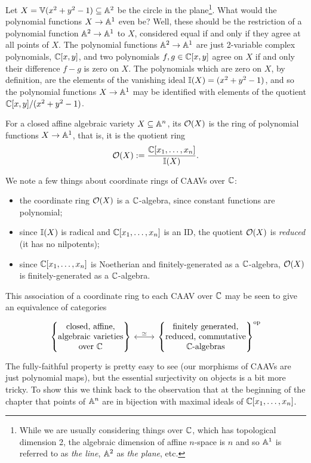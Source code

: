 \begin{eg}
	Let $X = \mathbb{V}(x^2 + y^2 - 1) \subseteq \mathbb{A}^2$ be the circle in the plane\footnote{While we are usually considering things over $\mathbb{C}$, which has topological dimension 2, the algebraic dimension of affine $n$-space is $n$ and so $\mathbb{A}^1$ is referred to as \emph{the line}, $\mathbb{A}^2$ as \emph{the plane}, etc.}. What would the polynomial functions $X \to \mathbb{A}^1$ even be? Well, these should be the restriction of a polynomial function $\mathbb{A}^2 \to \mathbb{A}^1$ to $X$, considered equal if and only if they agree at all points of $X$. The polynomial functions $\mathbb{A}^2 \to \mathbb{A}^1$ are just 2-variable complex polynomials, $\mathbb{C}[x,y]$, and two polynomials $f, g \in \mathbb{C}[x,y]$ agree on $X$ if and only their difference $f-g$ is zero on $X$. The polynomials which are zero on $X$, by definition, are the elements of the vanishing ideal $\mathbb{I}(X) = (x^2 + y^2 - 1)$, and so the polynomial functions $X \to \mathbb{A}^1$ may be identified with elements of the quotient $\mathbb{C}[x, y]/(x^2 + y^2 - 1)$.
\end{eg}

\begin{defn}
	For a closed affine algebraic variety $X \subseteq \mathbb{A}^n$, its  $\mathcal{O}(X)$ is the ring of polynomial functions $X \to \mathbb{A}^1$, that is, it is the quotient ring 
	\[
		\mathcal{O}(X) := \frac{\mathbb{C}[x_1,\ldots,x_n]}{\mathbb{I}(X)}.
	\]
\end{defn}

We note a few things about coordinate rings of CAAVs over $\mathbb{C}$:
\begin{itemize}
	\item the coordinate ring $\mathcal{O}(X)$ is a $\mathbb{C}$-algebra, since constant functions are polynomial;
	\item since $\mathbb{I}(X)$ is radical and $\mathbb{C}[x_1, \ldots, x_n]$ is an ID, the quotient $\mathcal{O}(X)$ is \emph{reduced} (it has no nilpotents);
	\item since $\mathbb{C}[x_1, \ldots, x_n]$ is Noetherian and finitely-generated as a $\mathbb{C}$-algebra, $\mathcal{O}(X)$ is finitely-generated as a $\mathbb{C}$-algebra.
\end{itemize}

This association of a coordinate ring to each CAAV over $\mathbb{C}$ may be seen to give an equivalence of categories
\[
	\begin{tikzcd}
		\left\{\bettersubstack{\text{closed, affine,} \\ \text{algebraic varieties} \\ \text{over }\C}\right\} \rar[leftrightarrow, "\simeq"] & \left\{\bettersubstack{\text{finitely generated,}\\ \text{reduced, commutative} \\ \C\text{-algebras}}\right\}^{\text{op}}
	\end{tikzcd}
\]
The fully-faithful property is pretty easy to see (our morphisms of CAAVs are just polynomial maps), but the essential surjectivity on objects is a bit more tricky. To show this we think back to the observation that at the beginning of the chapter that points of $\mathbb{A}^n$ are in bijection with maximal ideals of $\mathbb{C}[x_1, \ldots, x_n]$.\\ 

